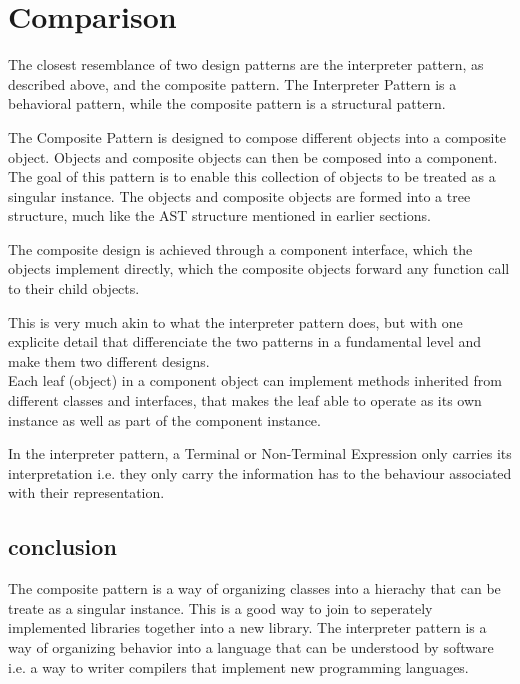 \section{Comparison}
The closest resemblance of two design patterns are the interpreter pattern, as described above, and
the composite pattern. The Interpreter Pattern is a behavioral pattern, while the composite pattern
is a structural pattern.

The Composite Pattern is designed to compose different objects into a composite object. Objects
and composite objects can then be composed into a component. The goal of this pattern is to
enable this collection of objects to be treated as a singular instance.
The objects and composite objects are formed into a tree structure, much like the 
AST structure mentioned in earlier sections.

The composite design is achieved through a component interface, which the objects
implement directly, which the composite objects forward any function call to their 
child objects.

This is very much akin to what the interpreter pattern does, but with one explicite detail
that differenciate the two patterns in a fundamental level and make them two different designs. \\

Each leaf (object) in a component object can implement methods inherited from different classes
and interfaces, that makes the leaf able to operate as its own instance as well as part
of the component instance.

In the interpreter pattern, a Terminal or Non-Terminal Expression only carries its interpretation
i.e\@. they only carry the information has to the behaviour associated with their representation.

\subsection{conclusion}
The composite pattern is a way of organizing classes into a hierachy that can be treate as 
a singular instance. This is a good way to join to seperately implemented libraries together
into a new library. The interpreter pattern is a way of organizing behavior into a language
that can be understood by software i.e\@. a way to writer compilers that implement new 
programming languages.

\newpage
